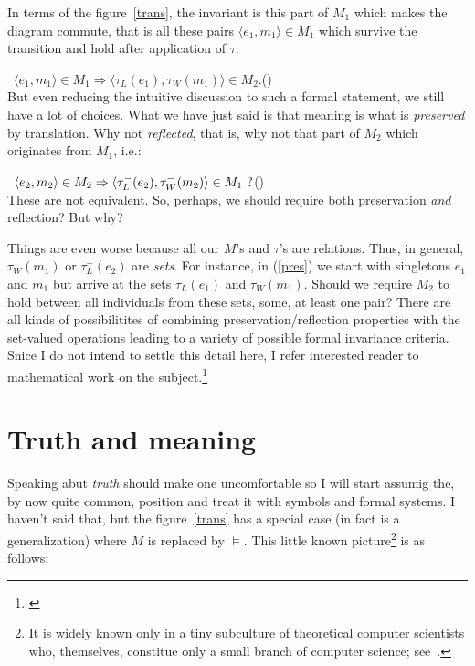 \documentclass[10pt]{article}
\newcounter{EQ}
\newcommand{\equ}[1]{\refstepcounter{EQ}\vspace{.5ex}\par\noindent\ 
    \hfill $#1$\hfill{(\theEQ)}\\[.5ex]}
\newcommand{\refe}[1]{(\ref{#1})}
\newcommand{\<}{\langle}
\renewcommand{\>}{\rangle}
\newcommand{\thi}[1]{{\sl{#1}\/}}
\begin{document}
In terms of the 
figure~\ref{trans}, the invariant is this part of $M_1$ which makes the 
diagram commute, that is all these pairs $\<e_1,m_1\>\in M_1$ which survive the 
transition and hold after application of $\tau:$ 
\equ{\label{pres}
\<e_1,m_1\> \in M_1 \Rightarrow \<\tau_L(e_1),\tau_W(m_1)\> \in M_2.
} 
But even reducing the intuitive discussion to such 
a formal statement, we still have a lot of choices. What we have just said 
is that meaning is what is {\em preserved} by translation. Why not {\em 
reflected}, that is, why not that part of $M_2$ which originates from $M_1$, i.e.:
\equ{\label{refl}
\<e_2,m_2\> \in M_2 \Rightarrow \<\tau_L^-(e_2),\tau_W^-(m_2)\> \in M_1 \ \mbox{\rm ?}
}
These are not equivalent. So, perhaps, we should require both 
preservation {\em and} reflection? But why?

Things are even worse because all our $M$'s and $\tau$'s are 
relations. Thus, in general, $\tau_W(m_1)$ or $\tau_L^-(e_2)$ are {\em 
sets}. For instance, in \refe{pres} we start with singletons $e_1$ and 
$m_1$ but arrive at the sets $\tau_L(e_1)$ and $\tau_W(m_1)$. Should we 
require $M_2$ to hold between all individuals from these sets, some, at 
least one pair?
There are all kinds of possibilitites of combining 
preservation/reflection properties with the set-valued operations leading 
to a variety of possible formal invariance criteria. Snice I do not intend 
to settle this detail here, I refer interested reader to mathematical work 
on the subject.\footnote{\cite{Koh, Brink, WB}}

\section{Truth and meaning}
Speaking abut \thi{truth} should make one uncomfortable so I will start 
assumig the, by now quite common, position and treat it with symbols and 
formal systems. I haven't said that, but the figure~\ref{trans} has a 
special case (in fact is a generalization) where 
 $M$ is replaced by $\models$. This little known picture\footnote{It is 
widely known only in a tiny subculture of theoretical computer scientists 
who, themselves, constitue only a small branch of computer science; see~\cite{Inst}.} 
is as 
follows:
\end{document}
